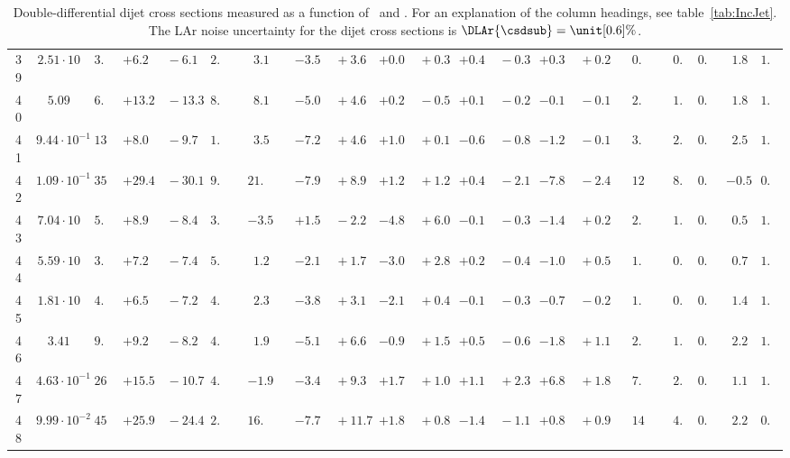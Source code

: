 \documentclass[12pt]{article}
\begin{document}
\begin{table}
\begin{tabular}{ccrr@{\hskip0pt}rrc@{\hskip0pt}r@{\hskip0pt}c@{\hskip0pt}r@{\hskip0pt}rr@{\hskip0pt}rr@{\hskip0pt}rr@{\hskip0pt}rr@{\hskip0pt}r@{\hskip0pt}r@{\hskip0pt}c|rr|r}
39 &$2.51 \cdot 10$ &$ 3.1$  & ${+6.2~}$&${~-6.1}$ & $ 2.8$  & &$ 3.1$&&${-3.5~}$&${~+3.6}$ & ${+0.0~}$&${~+0.3}$ & ${+0.4~}$&${~-0.3}$ & ${+0.3~}$&${~+0.2}$ & &$ 0.7$&&$ 0.4$  & $0.96$  & $ 1.8$  & $1.02$   \\ 
40 &$5.09$ &$ 6.7$  & ${+13.2~}$&${~-13.3}$ & $ 8.6$  & &$ 8.1$&&${-5.0~}$&${~+4.6}$ & ${+0.2~}$&${~-0.5}$ & ${+0.1~}$&${~-0.2}$ & ${-0.1~}$&${~-0.1}$ & &$ 2.0$&&$ 1.0$  & $0.96$  & $ 1.8$  & $1.03$   \\ 
41 &$9.44 \cdot 10^{-1}$ &$13.8$  & ${+8.0~}$&${~-9.7}$ & $ 1.4$  & &$ 3.5$&&${-7.2~}$&${~+4.6}$ & ${+1.0~}$&${~+0.1}$ & ${-0.6~}$&${~-0.8}$ & ${-1.2~}$&${~-0.1}$ & &$ 3.6$&&$ 2.5$  & $0.95$  & $ 2.5$  & $1.04$   \\ 
42 &$1.09 \cdot 10^{-1}$ &$35.2$  & ${+29.4~}$&${~-30.1}$ & $ 9.5$  & &$21.1$&&${-7.9~}$&${~+8.9}$ & ${+1.2~}$&${~+1.2}$ & ${+0.4~}$&${~-2.1}$ & ${-7.8~}$&${~-2.4}$ & &$12.7$&&$ 8.4$  & $0.97$  & $-0.5$  & $0.99$   \\ 
43 &$7.04 \cdot 10$ &$ 5.9$  & ${+8.9~}$&${~-8.4}$ & $ 3.9$  & &$-3.5$&&${+1.5~}$&${~-2.2}$ & ${-4.8~}$&${~+6.0}$ & ${-0.1~}$&${~-0.3}$ & ${-1.4~}$&${~+0.2}$ & &$ 2.0$&&$ 1.1$  & $0.89$  & $ 0.5$  & $1.05$   \\ 
44 &$5.59 \cdot 10$ &$ 3.7$  & ${+7.2~}$&${~-7.4}$ & $ 5.5$  & &$ 1.2$&&${-2.1~}$&${~+1.7}$ & ${-3.0~}$&${~+2.8}$ & ${+0.2~}$&${~-0.4}$ & ${-1.0~}$&${~+0.5}$ & &$ 1.0$&&$ 0.4$  & $0.95$  & $ 0.7$  & $1.03$   \\ 
45 &$1.81 \cdot 10$ &$ 4.4$  & ${+6.5~}$&${~-7.2}$ & $ 4.3$  & &$ 2.3$&&${-3.8~}$&${~+3.1}$ & ${-2.1~}$&${~+0.4}$ & ${-0.1~}$&${~-0.3}$ & ${-0.7~}$&${~-0.2}$ & &$ 1.2$&&$ 0.5$  & $0.97$  & $ 1.4$  & $1.01$   \\ 
46 &$3.41$ &$ 9.5$  & ${+9.2~}$&${~-8.2}$ & $ 4.3$  & &$ 1.9$&&${-5.1~}$&${~+6.6}$ & ${-0.9~}$&${~+1.5}$ & ${+0.5~}$&${~-0.6}$ & ${-1.8~}$&${~+1.1}$ & &$ 2.4$&&$ 1.4$  & $0.96$  & $ 2.2$  & $1.02$   \\ 
47 &$4.63 \cdot 10^{-1}$ &$26.9$  & ${+15.5~}$&${~-10.7}$ & $ 4.1$  & &$-1.9$&&${-3.4~}$&${~+9.3}$ & ${+1.7~}$&${~+1.0}$ & ${+1.1~}$&${~+2.3}$ & ${+6.8~}$&${~+1.8}$ & &$ 7.9$&&$ 2.9$  & $0.96$  & $ 1.1$  & $1.05$   \\ 
48 &$9.99 \cdot 10^{-2}$ &$45.8$  & ${+25.9~}$&${~-24.4}$ & $ 2.3$  & &$16.9$&&${-7.7~}$&${~+11.7}$ & ${+1.8~}$&${~+0.8}$ & ${-1.4~}$&${~-1.1}$ & ${+0.8~}$&${~+0.9}$ & &$14.4$&&$ 4.9$  & $0.96$  & $ 2.2$  & $0.97$   \\ 
\hline
\hline
\end{tabular}

    \caption{
      Double-differential dijet cross sections measured as a function of \Qsq\ and \meanptdi. 
      For an explanation of the column headings, see table~\ref{tab:IncJet}.
      The LAr noise uncertainty for the dijet cross sections is $\DLAr{\csdsub} = \unit[0.6]{\%}$.
  }
  \label{tab:Dijet}
\end{table}
\end{document}
